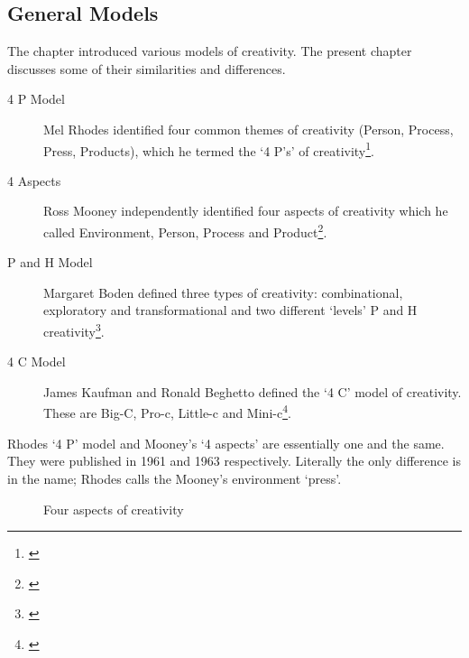\subsection{General Models}
\label{s:models}

The  chapter introduced various models of creativity. The present chapter discusses some of their similarities and differences.

\begin{description}
  \item [4 P Model] Mel Rhodes identified four common themes of creativity (Person, Process, Press, Products), which he termed the `4 P\rq s' of creativity\footnote{\autocite{Rhodes1961}}.
  \item [4 Aspects] Ross Mooney independently identified four aspects of creativity which he called Environment, Person, Process and Product\footnote{\autocite[as cited in][]{Sternberg1999}}.
  \item [P and H Model] Margaret Boden defined three types of creativity: combinational, exploratory and transformational and two different `levels' P and H creativity\footnote{\autocite{Boden2003}}.
  \item [4 C Model] James Kaufman and Ronald Beghetto defined the `4 C' model of creativity. These are Big-C, Pro-c, Little-c and Mini-c\footnote{\autocite{Kaufman2009}}.
\end{description}

Rhodes `4 P' model and Mooney's `4 aspects' are essentially one and the same. They were published in 1961 and 1963 respectively. Literally the only difference is in the name; Rhodes calls the Mooney's environment `press'.

\begin{figure}[!htbp] %
  \centering
  \tikzset{every fit/.append style=text badly centered}
\caption[Four aspects of creativity]{Four aspects of creativity}
\label{fig:4Crea}
\end{figure}

